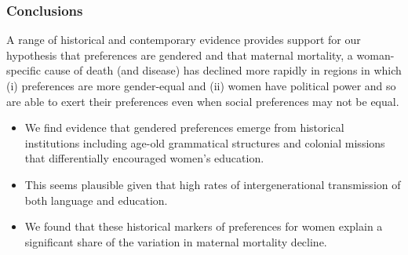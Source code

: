 \documentclass[9pt,letterpaper,subeqn]{beamer}
\begin{document}
\begin{frame}
\frametitle{Conclusions}
A range of historical and contemporary evidence provides support for our hypothesis that preferences are gendered and that maternal mortality, a woman-specific cause of death (and disease) has declined more rapidly in regions in which (i) preferences are more gender-equal and (ii) women have political power and so are able to exert their preferences even when social preferences may not be equal.
\vspace{3mm}
\begin{itemize}
  \setlength{\itemsep}{10pt}
\item We find evidence that gendered preferences emerge from historical institutions including age-old grammatical structures and colonial missions that differentially encouraged women's education.
\item This seems plausible given that high rates of intergenerational transmission of both language and education.
\item We found that these historical markers of preferences for women explain a significant share of the variation in maternal mortality decline.
\end{itemize}
\end{frame}
\end{document}
